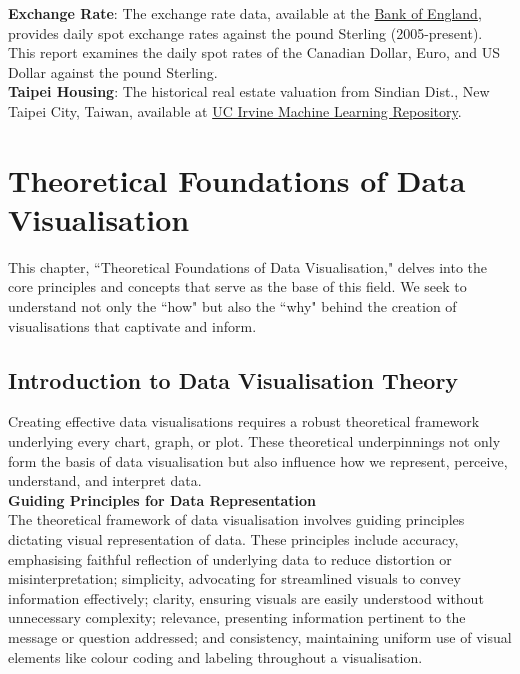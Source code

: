 \documentclass{article}\usepackage[]{graphicx}\usepackage[]{xcolor}
\numberwithin{equation}{section}
\begin{document}
\noindent
\textbf{Exchange Rate}: The exchange rate data, available at the \href{https://www.bankofengland.co.uk/boeapps/database/index.asp?first=yes&SectionRequired=I&HideNums=-1&ExtraInfo=true&Travel=NIx}{Bank of England}, provides daily spot exchange rates against the pound Sterling (2005-present). This report examines the daily spot rates of the Canadian Dollar, Euro, and US Dollar against the pound Sterling.\\

\noindent
\textbf{Taipei Housing}: The historical real estate valuation from Sindian Dist., New Taipei City, Taiwan,  available at \href{https://archive.ics.uci.edu/dataset/477/real+estate+valuation+data+set}{UC Irvine Machine Learning Repository}.

\newpage 

\section{Theoretical Foundations of Data Visualisation}
This chapter, ``Theoretical Foundations of Data Visualisation," delves into the core principles and concepts that serve as the base of this field. We seek to understand not only the ``how" but also the ``why" behind the creation of visualisations that captivate and inform.

\subsection{Introduction to Data Visualisation Theory}
Creating effective data visualisations requires a robust theoretical framework underlying every chart, graph, or plot. These theoretical underpinnings not only form the basis of data visualisation but also influence how we represent, perceive, understand, and interpret data.\\ 

\noindent \textbf{Guiding Principles for Data Representation}\\
The theoretical framework of data visualisation involves guiding principles dictating visual representation of data. These principles include accuracy, emphasising faithful reflection of underlying data to reduce distortion or misinterpretation; simplicity, advocating for streamlined visuals to convey information effectively; clarity, ensuring visuals are easily understood without unnecessary complexity; relevance, presenting information pertinent to the message or question addressed; and consistency, maintaining uniform use of visual elements like colour coding and labeling throughout a visualisation.\\
\end{document}
